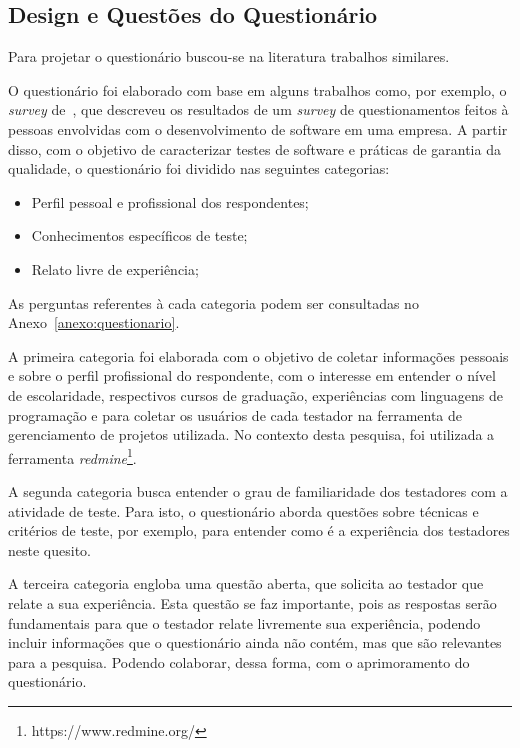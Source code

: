 \subsection{Design e Questões do Questionário}
\label{sec:desingquestions}

Para projetar o questionário buscou-se na literatura trabalhos similares.

O questionário foi elaborado com base em alguns trabalhos como, por exemplo, o \textit{survey} de~\cite{geras2004survey}, que descreveu os resultados de um \textit{survey} de questionamentos feitos à pessoas envolvidas com o desenvolvimento de software em uma empresa. A partir disso, com o objetivo de caracterizar testes de software e práticas de garantia da qualidade, o questionário foi dividido nas seguintes categorias:

\begin{itemize}
\item  Perfil pessoal e profissional dos respondentes;
\item  Conhecimentos específicos de teste;
\item  Relato livre de experiência;
\end{itemize}

As perguntas referentes à cada categoria podem ser consultadas no Anexo~\ref{anexo:questionario}.

A primeira categoria foi elaborada com o objetivo de coletar informações pessoais e sobre o perfil profissional do respondente, com o interesse em entender o nível de escolaridade, respectivos cursos de graduação, experiências com linguagens de programação e para coletar os usuários de cada testador na ferramenta de gerenciamento de projetos utilizada. No contexto desta pesquisa, foi utilizada a ferramenta \textit{redmine}\footnote{https://www.redmine.org/}. 

A segunda categoria busca entender o grau de familiaridade dos testadores com a atividade de teste. Para isto, o questionário aborda questões sobre técnicas e critérios de teste, por exemplo, para entender como é a experiência dos testadores neste quesito.

A terceira categoria engloba uma questão aberta, que solicita ao testador que relate a sua experiência. Esta questão se faz importante, pois as respostas serão fundamentais para que o testador relate livremente sua experiência, podendo incluir informações que o questionário ainda não contém, mas que são relevantes para a pesquisa. Podendo colaborar, dessa forma, com o aprimoramento do questionário. 

